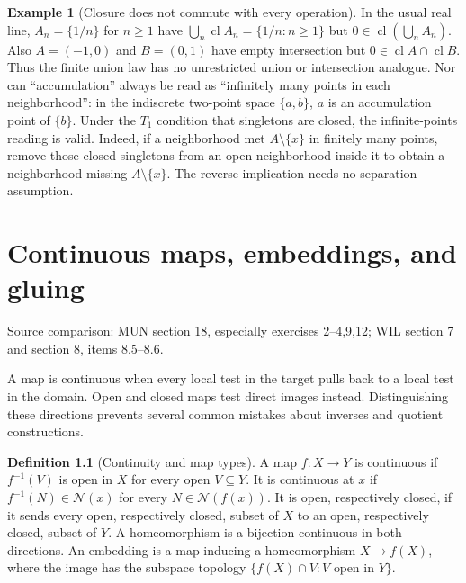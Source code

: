 \documentclass[11pt,oneside,openany]{book}
\theoremstyle{definition}
\newtheorem{definition}[theorem]{Definition}
\newtheorem{example}[theorem]{Example}
\theoremstyle{remark}
\DeclareMathOperator{\cl}{cl}
\newcommand{\source}[1]{\par\begingroup\small\sffamily\color{black!65}Source comparison: #1\par\endgroup}
\begin{document}
\begin{example}[Closure does not commute with every operation]\label{d10:01:closure-cautions}
In the usual real line, $A_n=\{1/n\}$ for $n\ge1$ have $\bigcup_n\cl A_n=\{1/n:n\ge1\}$ but $0\in\cl(\bigcup_n A_n)$. Also $A=(-1,0)$ and $B=(0,1)$ have empty intersection but $0\in\cl A\cap\cl B$. Thus the finite union law has no unrestricted union or intersection analogue. Nor can ``accumulation'' always be read as ``infinitely many points in each neighborhood'': in the indiscrete two-point space $\{a,b\}$, $a$ is an accumulation point of $\{b\}$. Under the $T_1$ condition that singletons are closed, the infinite-points reading is valid. Indeed, if a neighborhood met $A\setminus\{x\}$ in finitely many points, remove those closed singletons from an open neighborhood inside it to obtain a neighborhood missing $A\setminus\{x\}$. The reverse implication needs no separation assumption.
\end{example}



\chapter{Continuous maps, embeddings, and gluing}\label{ch:d10-02}
\source{MUN section 18, especially exercises 2--4,9,12; WIL section 7 and section 8, items 8.5--8.6.}

A map is continuous when every local test in the target pulls back to a local test in the domain. Open and closed maps test direct images instead. Distinguishing these directions prevents several common mistakes about inverses and quotient constructions.

\begin{definition}[Continuity and map types]\label{d10:02:maps}
A map $f:X\to Y$ is continuous if $f^{-1}(V)$ is open in $X$ for every open $V\subseteq Y$. It is continuous at $x$ if $f^{-1}(N)\in\mathcal N(x)$ for every $N\in\mathcal N(f(x))$. It is open, respectively closed, if it sends every open, respectively closed, subset of $X$ to an open, respectively closed, subset of $Y$. A homeomorphism is a bijection continuous in both directions. An embedding is a map inducing a homeomorphism $X\to f(X)$, where the image has the subspace topology $\{f(X)\cap V:V\text{ open in }Y\}$.
\end{definition}
\end{document}
